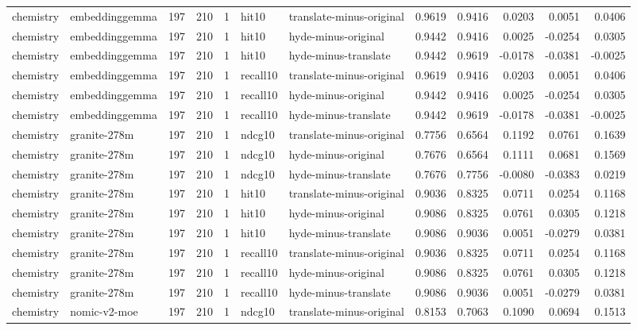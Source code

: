 \begin{tabular}{llrrrllrrrrr}
chemistry & embeddinggemma & 197 & 210 & 1 & hit10 & translate-minus-original & 0.9619 & 0.9416 & 0.0203 & 0.0051 & 0.0406 \\
chemistry & embeddinggemma & 197 & 210 & 1 & hit10 & hyde-minus-original & 0.9442 & 0.9416 & 0.0025 & -0.0254 & 0.0305 \\
chemistry & embeddinggemma & 197 & 210 & 1 & hit10 & hyde-minus-translate & 0.9442 & 0.9619 & -0.0178 & -0.0381 & -0.0025 \\
chemistry & embeddinggemma & 197 & 210 & 1 & recall10 & translate-minus-original & 0.9619 & 0.9416 & 0.0203 & 0.0051 & 0.0406 \\
chemistry & embeddinggemma & 197 & 210 & 1 & recall10 & hyde-minus-original & 0.9442 & 0.9416 & 0.0025 & -0.0254 & 0.0305 \\
chemistry & embeddinggemma & 197 & 210 & 1 & recall10 & hyde-minus-translate & 0.9442 & 0.9619 & -0.0178 & -0.0381 & -0.0025 \\
chemistry & granite-278m & 197 & 210 & 1 & ndcg10 & translate-minus-original & 0.7756 & 0.6564 & 0.1192 & 0.0761 & 0.1639 \\
chemistry & granite-278m & 197 & 210 & 1 & ndcg10 & hyde-minus-original & 0.7676 & 0.6564 & 0.1111 & 0.0681 & 0.1569 \\
chemistry & granite-278m & 197 & 210 & 1 & ndcg10 & hyde-minus-translate & 0.7676 & 0.7756 & -0.0080 & -0.0383 & 0.0219 \\
chemistry & granite-278m & 197 & 210 & 1 & hit10 & translate-minus-original & 0.9036 & 0.8325 & 0.0711 & 0.0254 & 0.1168 \\
chemistry & granite-278m & 197 & 210 & 1 & hit10 & hyde-minus-original & 0.9086 & 0.8325 & 0.0761 & 0.0305 & 0.1218 \\
chemistry & granite-278m & 197 & 210 & 1 & hit10 & hyde-minus-translate & 0.9086 & 0.9036 & 0.0051 & -0.0279 & 0.0381 \\
chemistry & granite-278m & 197 & 210 & 1 & recall10 & translate-minus-original & 0.9036 & 0.8325 & 0.0711 & 0.0254 & 0.1168 \\
chemistry & granite-278m & 197 & 210 & 1 & recall10 & hyde-minus-original & 0.9086 & 0.8325 & 0.0761 & 0.0305 & 0.1218 \\
chemistry & granite-278m & 197 & 210 & 1 & recall10 & hyde-minus-translate & 0.9086 & 0.9036 & 0.0051 & -0.0279 & 0.0381 \\
chemistry & nomic-v2-moe & 197 & 210 & 1 & ndcg10 & translate-minus-original & 0.8153 & 0.7063 & 0.1090 & 0.0694 & 0.1513 \\

\end{tabular}
